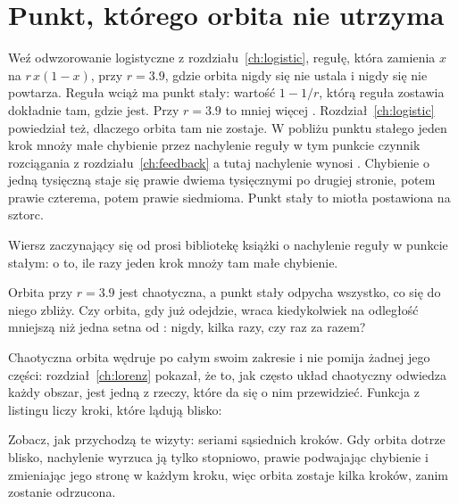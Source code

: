 \section{Punkt, którego orbita nie utrzyma}
\label{sec:ch17-point}

\noindent
Weź odwzorowanie logistyczne z rozdziału~\ref{ch:logistic}, regułę, która
zamienia $x$ na $r\,x(1 - x)$, przy $r = \num{3.9}$, gdzie orbita nigdy się
nie ustala i nigdy się nie powtarza. Reguła wciąż ma punkt stały: wartość
$1 - 1/r$, którą reguła zostawia dokładnie tam, gdzie jest. Przy
$r = \num{3.9}$ to mniej więcej . Rozdział~\ref{ch:logistic}
powiedział też, dlaczego orbita tam nie zostaje. W pobliżu punktu stałego
jeden krok mnoży małe chybienie przez nachylenie reguły w tym punkcie
\dash{} czynnik rozciągania z rozdziału~\ref{ch:feedback} \dash{} a tutaj
nachylenie wynosi . Chybienie o jedną tysięczną staje się
prawie dwiema tysięcznymi po drugiej stronie, potem prawie czterema, potem
prawie siedmioma. Punkt stały to miotła postawiona na sztorc.


\noindent
Wiersz zaczynający się od  prosi bibliotekę książki o
nachylenie reguły w punkcie stałym: o to, ile razy jeden krok mnoży tam małe
chybienie.

\begin{think}
Orbita przy $r = \num{3.9}$ jest chaotyczna, a punkt stały odpycha wszystko,
co się do niego zbliży. Czy orbita, gdy już odejdzie, wraca kiedykolwiek
na odległość mniejszą niż jedna setna od : nigdy, kilka razy,
czy raz za razem?
\end{think}
Chaotyczna orbita wędruje po całym swoim zakresie i nie pomija żadnej jego
części: rozdział~\ref{ch:lorenz} pokazał, że to, jak często układ chaotyczny
odwiedza każdy obszar, jest jedną z rzeczy, które da się o nim przewidzieć.
Funkcja  z listingu liczy kroki, które lądują blisko:


\noindent
Zobacz, jak przychodzą te wizyty: seriami sąsiednich kroków. Gdy orbita
dotrze blisko, nachylenie  wyrzuca ją tylko stopniowo,
prawie podwajając chybienie i zmieniając jego stronę w każdym kroku, więc
orbita zostaje kilka kroków, zanim zostanie odrzucona.


